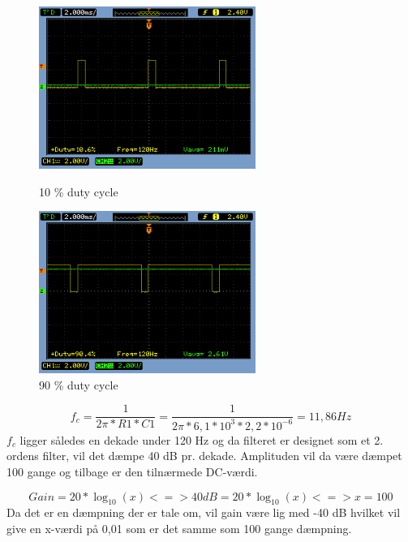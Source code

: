 \begin{figure}[htb]
\begin{minipage}{0.4\textwidth} 
\includegraphics[height=150pt]{filer/design/Billeder/sht_dutycycle10.png}
\caption{\textnormal{10 \% duty cycle}}
\label{lab:sht_dc10}
\end{minipage}
\hspace{0.10\textwidth}
\begin{minipage}{0.4\textwidth}
\includegraphics[height=150pt]{filer/design/Billeder/sht_dutycycle90.png}
\caption{\textnormal{90 \% duty cycle}}
\label{lab:sht_dc90}
\end{minipage}
\hfill
\end{figure}

\begin{equation}
f_c = \frac{1}{2 \pi * R1 * C1} = \frac{1}{2 \pi * 6,1*10^3  * 2,2*10^{-6}} = 11,86 Hz
\end{equation}
$f_c$ ligger således en dekade under 120 Hz og da filteret er designet som et 2. ordens filter, vil det dæmpe 40 dB pr. dekade. Amplituden vil da være dæmpet 100 gange og tilbage er den tilnærmede DC-værdi.

\begin{equation}
Gain = 20 * \log_{10}(x) <=> 40 dB = 20 * \log_ {10}(x) <=> x = 100
\end{equation} 
Da det er en dæmpning der er tale om, vil gain være lig med -40 dB hvilket vil give en x-værdi på 0,01 som er det samme som 100 gange dæmpning.

